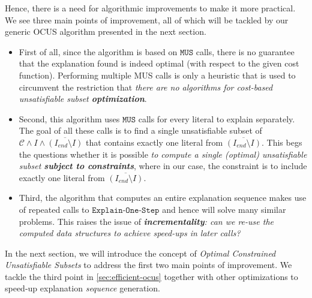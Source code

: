 \documentclass[a4paper,UKenglish,cleveref, autoref, thm-restate, pdfa]{lipics-v2021}
\newcommand\m[1]{\mathcal{#1}}
\renewcommand\comment[1]{}
\newcommand{\bart}[1]{{\comment{\color{OliveGreen}Bart: #1}}}
\newcommand\Iend{\ensuremath{I_\mathit{end} }\xspace}
\newcommand\formulac{\ensuremath{\m{C} }\xspace}
\newcommand\mm[1]{\ensuremath{#1}\xspace}
\newcommand\call[1]{\mm{\texttt{#1}}}
\newcommand\onestep{\ensuremath{\call{Explain-One-Step}}\xspace}
\begin{document}
	Hence, there is a need for algorithmic improvements to make it more practical.
	We see three main points of improvement, all of which will be tackled by our generic OCUS algorithm presented in the next section. 
	
	\begin{itemize}
		
		\item First of all, since the algorithm is based on \call{MUS} calls, there is no guarantee that the explanation found is indeed optimal (with respect to the given cost function). Performing multiple MUS calls  is only a heuristic that is used to circumvent the restriction that \textit{there are no algorithms for cost-based unsatisfiable subset \textbf{optimization}}. 
		
		\item Second, this algorithm uses \call{MUS} calls for every literal to explain separately. The goal of all these calls is to find a single unsatisfiable subset of $\formulac \land I \land \overline{(\Iend\setminus I)}$ that contains exactly one literal from $\overline{(\Iend\setminus I)}$. This begs the questions whether it is possible \textit{to compute a single (optimal) unsatisfiable subset \textbf{subject to constraints}}, where in our case, the constraint is to include exactly one literal from $\overline{(\Iend\setminus I)}$. 
		
		\item Third, the algorithm that computes an entire explanation sequence makes use of repeated calls to \onestep and hence will solve many similar problems. This raises the issue of \textit{\textbf{incrementality}: can we re-use the computed data structures to achieve speed-ups in later calls?}
		
	\end{itemize}
	
	
	In the next section, we will introduce the concept of \emph{Optimal Constrained Unsatisfiable Subsets} to address the first two main points of improvement. We tackle the third point in \cref{sec:efficient-ocus} together with other optimizations to speed-up explanation \emph{sequence} generation. %
	
\end{document}
